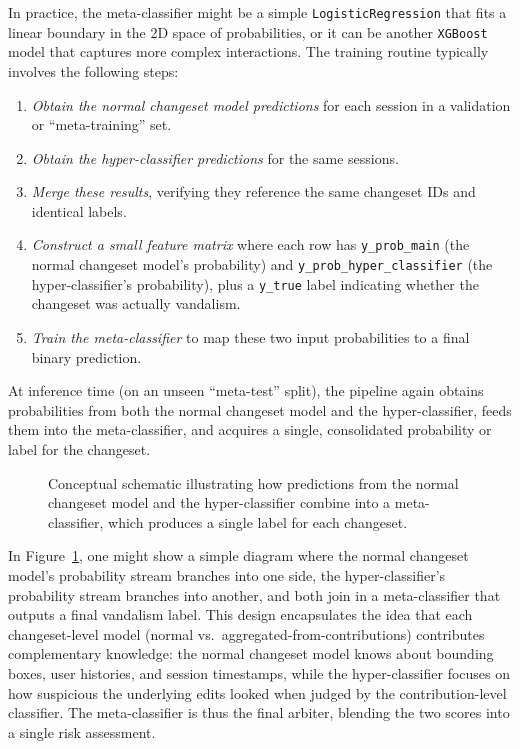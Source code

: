 \documentclass[
    13pt, %
    a4paper, %
    twoside, 
    DIV14, %
    listof=totoc, %
    bibliography=totoc, %
    index=totoc, %
    headsepline
]{scrreprt}
\begin{document}
In practice, the meta-classifier might be a simple \texttt{LogisticRegression} that fits a linear boundary in the 2D space of probabilities, or it can be another \texttt{XGBoost} model that captures more complex interactions. The training routine typically involves the following steps:
\begin{enumerate}
    \item \emph{Obtain the normal changeset model predictions} for each session in a validation or “meta-training” set.  
    \item \emph{Obtain the hyper-classifier predictions} for the same sessions.  
    \item \emph{Merge these results}, verifying they reference the same changeset IDs and identical labels.  
    \item \emph{Construct a small feature matrix} where each row has \texttt{y\_prob\_main} (the normal changeset model’s probability) and \texttt{y\_prob\_hyper\_classifier} (the hyper-classifier’s probability), plus a \texttt{y\_true} label indicating whether the changeset was actually vandalism.  
    \item \emph{Train the meta-classifier} to map these two input probabilities to a final binary prediction.  
\end{enumerate}
At inference time (on an unseen “meta-test” split), the pipeline again obtains probabilities from both the normal changeset model and the hyper-classifier, feeds them into the meta-classifier, and acquires a single, consolidated probability or label for the changeset.

\begin{figure}[htbp]
    \centering
    \caption{Conceptual schematic illustrating how predictions from the normal changeset model and the hyper-classifier combine into a meta-classifier, which produces a single label for each changeset.}
    \label{fig:meta_classifier_schematic}
\end{figure}

In Figure~\ref{fig:meta_classifier_schematic}, one might show a simple diagram where the normal changeset model’s probability stream branches into one side, the hyper-classifier’s probability stream branches into another, and both join in a meta-classifier that outputs a final vandalism label. This design encapsulates the idea that each changeset-level model (normal vs.\ aggregated-from-contributions) contributes complementary knowledge: the normal changeset model knows about bounding boxes, user histories, and session timestamps, while the hyper-classifier focuses on how suspicious the underlying edits looked when judged by the contribution-level classifier. The meta-classifier is thus the final arbiter, blending the two scores into a single risk assessment.
\end{document}
